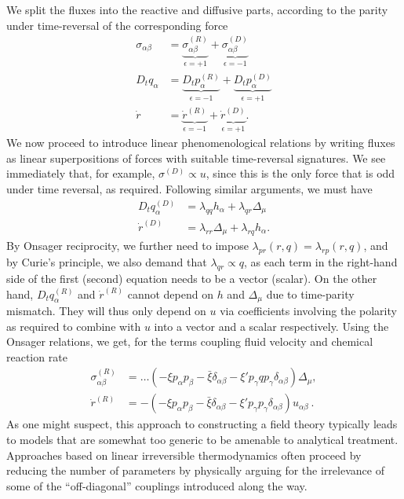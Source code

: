 We split the fluxes into the reactive and diffusive parts, according to the parity under time-reversal of the corresponding force
%
\begin{align}
    \sigma_{\alpha \beta} 
    & = \underbrace{\sigma_{\alpha \beta}^{(R)}}_{\epsilon=+1}
    + \underbrace{\sigma_{\alpha \beta}^{(D)}}_{\epsilon=-1}\\
    D_t q_\alpha
    & = \underbrace{D_t p_\alpha^{(R)}}_{\epsilon=-1}
    + \underbrace{D_t p_\alpha^{(D)}}_{\epsilon=+1}\\
    \dot r
    & = \underbrace{\dot r^{(R)}}_{\epsilon=-1}
    + \underbrace{\dot r^{(D)}}_{\epsilon=+1}.
\end{align}
%
We now proceed to introduce linear phenomenological relations by writing fluxes as linear superpositions of forces with suitable time-reversal signatures. We see immediately that, for example, $\sigma^{(D)} \propto u$, since this is the only force that is odd under time reversal, as required.
Following similar arguments, we must have
%
\begin{align}
    D_t q_\alpha^{(D)} &= \lambda_{qq} h_\alpha + \lambda_{qr} \Delta_\mu \\
    \dot r^{(D)} &= \lambda_{rr} \Delta_\mu + \lambda_{rq} h_\alpha.
\end{align}
%
By Onsager reciprocity, we further need to impose $\lambda_{pr}(r, q) = \lambda_{rp}(r, q)$, and by Curie's principle, we also demand that $\lambda_{q r} \propto q$, as each term in the right-hand side of the first (second) equation needs to be a vector (scalar).
On the other hand, $D_t q_\alpha^{(R)}$ and $\dot r^{(R)}$ cannot depend on $h$ and $\Delta_\mu$ due to time-parity mismatch. They will thus only depend on $u$ via coefficients involving the polarity as required to combine with $u$ into a vector and a scalar respectively.
Using the Onsager relations, we get, for the terms coupling fluid velocity and chemical reaction rate
%
\begin{align}
    \sigma_{\alpha \beta}^{(R)} 
    &= \dots
    \left(- \xi p_\alpha p_\beta - \bar \xi \delta_{\alpha \beta} - \xi' p_\gamma qp_\gamma \delta_{\alpha \beta}\right)
    \Delta_\mu, \\
    \dot r^{(R)} 
    &= -
    \left(- \xi p_\alpha p_\beta - \bar \xi \delta_{\alpha \beta} - \xi' p_\gamma p_\gamma \delta_{\alpha \beta}\right)
    u_{\alpha \beta}~.
\end{align}
As one might suspect, this approach to constructing a field theory typically leads to models that are somewhat too generic to be amenable to analytical treatment. Approaches based on linear irreversible thermodynamics often proceed by reducing the number of parameters by physically arguing for the irrelevance of some of the ``off-diagonal'' couplings introduced along the way. 
